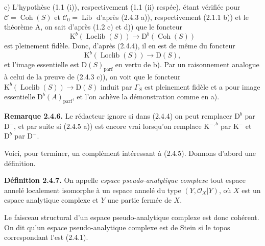 \documentclass[11pt]{article}
\providecommand{\Lib}{\operatorname{Lib}}
\providecommand{\Loclib}{\operatorname{Loclib}}
\providecommand{\Coh}{\operatorname{Coh}}
\providecommand{\parf}{\operatorname{parf}}
\begin{document}
c) L'hypothèse (1.1 (i)), respectivement (1.1 (ii) respée), étant vérifiée pour $\mathcal C=\Coh(S)$ et $\mathcal C_0=\Lib$ d'après (2.4.3 a)), respectivement (2.1.1 b)) et le théorème A, on sait d'après (1.2 c) et d)) que le foncteur
\[
\mathrm K^b(\Loclib(S))\longrightarrow\mathrm D^b(\Coh(S))
\]
est pleinement fidèle. Donc, d'après (2.4.4), il en est de même du foncteur
\[
\mathrm K^b(\Loclib(S))\longrightarrow\mathrm D(S),
\]
et l'image essentielle est $\mathrm D(S)_{\parf}$ en vertu de b). Par un raisonnement analogue à celui de la preuve de (2.4.3 c)), on voit que le foncteur $\mathrm K^b(\Loclib(S))\to\mathrm D(S)$ induit par $\Gamma_S$ est pleinement fidèle et a pour image essentielle $\mathrm D^b(A)_{\parf}$, et l'on achève la démonstration comme en a).

\textbf{Remarque 2.4.6.} Le rédacteur ignore si dans (2.4.4) on peut remplacer $\mathrm D^b$ par $\mathrm D^{-}$, et par suite si (2.4.5 a)) est encore vrai lorsqu'on remplace $\mathrm K^{-,b}$ par $\mathrm K^{-}$ et $\mathrm D^b$ par $\mathrm D^{-}$.

Voici, pour terminer, un complément intéressant à (2.4.5). Donnons d'abord une définition.

\textbf{Définition 2.4.7.} On appelle \emph{espace pseudo-analytique complexe} tout espace annelé localement isomorphe à un espace annelé du type $(Y,\mathcal O_X|Y)$, où $X$ est un espace analytique complexe et $Y$ une partie fermée de $X$.

Le faisceau structural d'un espace pseudo-analytique complexe est donc cohérent. On dit qu'un espace pseudo-analytique complexe est de Stein si le topos correspondant l'est (2.4.1).
\end{document}

